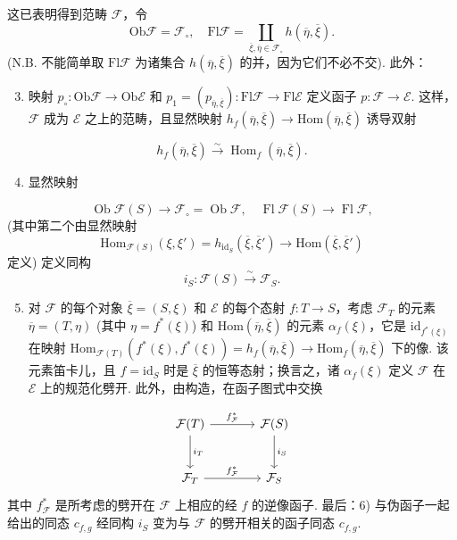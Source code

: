 这已表明得到范畴 $\mathcal{F}$，令
\[
\mathrm{Ob} \mathcal{F} = \mathcal{F}_{\circ}, \quad \mathrm{Fl} \mathcal{F} = \coprod_{\overline{\xi}, \overline{\eta} \in \mathcal{F}_{\circ}} h(\overline{\eta}, \overline{\xi}).
\]
(N.B. 不能简单取 $\mathrm{Fl} \mathcal{F}$ 为诸集合 $h(\overline{\eta}, \overline{\xi})$ 的并，因为它们不必不交). 此外：
\begin{enumerate}[1)]
\setcounter{enumi}{2}
\item 映射 $p_{\circ} \colon \mathrm{Ob} \mathcal{F} \to \mathrm{Ob} \mathcal{E}$ 和 $p_1 = (p_{\overline{\eta},\overline{\xi}}) \colon \mathrm{Fl} \mathcal{F} \to \mathrm{Fl} \mathcal{E}$ 定义函子 $p \colon \mathcal{F} \to \mathcal{E}$. 这样，$\mathcal{F}$ 成为 $\mathcal{E}$ 之上的范畴，且显然映射 $h_f(\overline{\eta}, \overline{\xi}) \to \mathrm{Hom}(\overline{\eta}, \overline{\xi})$ 诱导双射
\end{enumerate}
\[
h_f(\overline{\eta}, \overline{\xi}) \stackrel{\sim}{\longrightarrow} \operatorname{Hom}_f(\overline{\eta}, \overline{\xi}).
\]
\begin{enumerate}[1)]
\setcounter{enumi}{3}
\item 显然映射
\end{enumerate}
\[
\operatorname{Ob} \mathcal{F}(S) \longrightarrow \mathcal{F}_{\circ} = \operatorname{Ob} \mathcal{F}, \quad \operatorname{Fl} \mathcal{F}(S) \longrightarrow \operatorname{Fl} \mathcal{F},
\]
(其中第二个由显然映射
\[
\mathrm{Hom}_{\mathcal{F}(S)}(\xi, \xi') = h_{\mathrm{id}_S}(\overline{\xi}, \overline{\xi}') \longrightarrow \mathrm{Hom}(\overline{\xi}, \overline{\xi}')
\]
定义) 定义同构
\[
i_S \colon \mathcal{F}(S) \stackrel{\sim}{\longrightarrow} \mathcal{F}_S.
\]
\begin{enumerate}[1)]
\setcounter{enumi}{4}
\item 对 $\mathcal{F}$ 的每个对象 $\overline{\xi} = (S, \xi)$ 和 $\mathcal{E}$ 的每个态射 $f \colon T \to S$，考虑 $\mathcal{F}_T$ 的元素 $\overline{\eta} = (T, \eta)$ (其中 $\eta = f^{*}(\xi)$) 和 $\mathrm{Hom}(\overline{\eta}, \overline{\xi})$ 的元素 $\alpha_f(\xi)$，它是 $\mathrm{id}_{f^{*}(\xi)}$ 在映射 Hom$_{\mathcal{F}(T)}(f^{*}(\xi), f^{*}(\xi)) = h_f(\overline{\eta}, \overline{\xi}) \to \mathrm{Hom}_f(\overline{\eta}, \overline{\xi})$ 下的像. 该元素笛卡儿，且 $f = \mathrm{id}_S$ 时是 $\overline{\xi}$ 的恒等态射；换言之，诸 $\alpha_f(\xi)$ 定义 $\mathcal{F}$ 在 $\mathcal{E}$ 上的规范化劈开. 此外，由构造，在函子图式中交换
\end{enumerate}
\[
\begin{tikzcd}[row sep=large, column sep=large]
\mathcal{F}(T) \arrow[r,"{f^{*}_{\mathcal{F}}}"] \arrow[d,"{i_T}"] & \mathcal{F}(S) \arrow[d,"{i_S}"] \\
\mathcal{F}_T \arrow[r,"{f^{*}_{\mathcal{F}}}"] & \mathcal{F}_S
\end{tikzcd}
\]
其中 $f^{*}_{\mathcal{F}}$ 是所考虑的劈开在 $\mathcal{F}$ 上相应的经 $f$ 的逆像函子. 最后：6) 与伪函子一起给出的同态 $c_{f,g}$ 经同构 $i_S$ 变为与 $\mathcal{F}$ 的劈开相关的函子同态 $c_{f,g}$.

